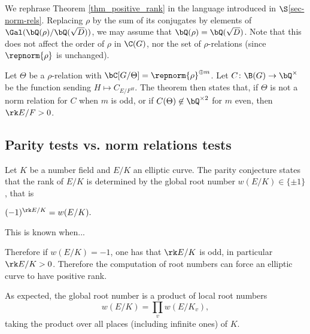 \begin{rem}\label{rephrase-thm}
We rephrase Theorem \ref{thm_positive_rank} in the language introduced in $\S$\ref{sec-norm-rels}. 
Replacing $\rho$ by the sum of its conjugates by elements of $ \Gal(\bQ(\rho) / \bQ(\sqrt{D}))$, we may assume that $\bQ(\rho) = \bQ(\sqrt{D})$. Note that this does not affect the order of $\rho$ in $\C(G)$, nor the set of $\rho$-relations (since $\repnorm{\rho}$ is unchanged). 

Let $\Theta$ be a $\rho$-relation with $\bC[G / \Theta] = \repnorm{\rho}^{\oplus m}$. Let $C \colon \B(G) \to \bQ^{\times}$ be the function sending $H \mapsto C_{E / F^H}$. The theorem then states that, if $\Theta$ is not a norm relation for $C$ when $m$ is odd, or if $C(\Theta) \not\in \bQ^{\times 2}$ for $m$ even, then $ \rk E / F > 0$. 
\end{rem}



\subsection{Parity tests vs. norm relations tests}

Let $K$ be a number field and $E / K$ an elliptic curve. The parity conjecture states that the rank of $E / K$ is determined by the global root number $w(E / K) \in \{ \pm 1 \}$, that is

\begin{conj}
    $(-1)^{\rk E / K} = w(E / K).$
\end{conj}

{\color{red} This is known when... }

Therefore if $w(E / K) = -1$, one has that $\rk E / K$ is odd, in particular $\rk E / K > 0$. Therefore the computation of root numbers can force an elliptic curve to have positive rank. 

As expected, the global root number is a product of local root numbers 
\[ w(E / K) = \prod_v w(E / K_v), \]
taking the product over all places (including infinite ones) of $K$. 